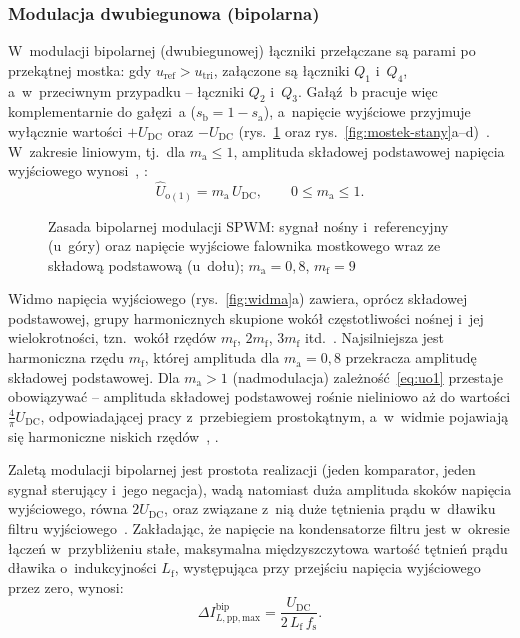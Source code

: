 \subsubsection*{Modulacja dwubiegunowa (bipolarna)}

W~modulacji bipolarnej (dwubiegunowej) łączniki przełączane są parami po
przekątnej mostka: gdy $u_\mathrm{ref} > u_\mathrm{tri}$, załączone są
łączniki $Q_1$ i~$Q_4$, a~w~przeciwnym przypadku -- łączniki $Q_2$ i~$Q_3$.
Gałąź~b pracuje więc komplementarnie do gałęzi~a ($s_\mathrm{b} = 1 -
s_\mathrm{a}$), a~napięcie wyjściowe przyjmuje wyłącznie wartości
$+U_\mathrm{DC}$ oraz $-U_\mathrm{DC}$ (rys.~\ref{fig:pwm-bipolarna}
oraz rys.~\ref{fig:mostek-stany}a--d)~\cite[s.~20]{instrukcja}.
W~zakresie liniowym, tj.~dla $m_\mathrm{a} \leq 1$, amplituda składowej
podstawowej napięcia wyjściowego wynosi~\cite[s.~11--12]{instrukcja},
\cite[podrozdz.~8-3-2-1]{mohan2003}:
\begin{equation}
  \hat{U}_{\mathrm{o}(1)} = m_\mathrm{a}\, U_\mathrm{DC},
  \qquad 0 \leq m_\mathrm{a} \leq 1.
  \label{eq:uo1}
\end{equation}

\begin{figure}[htbp]
  \centering
  
  \caption{Zasada bipolarnej modulacji SPWM: sygnał nośny i~referencyjny
    (u~góry) oraz napięcie wyjściowe falownika mostkowego wraz ze składową
    podstawową (u~dołu); $m_\mathrm{a} = 0{,}8$, $m_\mathrm{f} = 9$}
  \label{fig:pwm-bipolarna}
\end{figure}

Widmo napięcia wyjściowego (rys.~\ref{fig:widma}a) zawiera, oprócz
składowej podstawowej, grupy harmonicznych skupione wokół częstotliwości
nośnej i~jej wielokrotności, tzn.~wokół rzędów $m_\mathrm{f}$,
$2m_\mathrm{f}$, $3m_\mathrm{f}$ itd.~\cite[s.~193]{mohan2012}. Najsilniejsza jest harmoniczna rzędu
$m_\mathrm{f}$, której amplituda dla $m_\mathrm{a} = 0{,}8$ przekracza
amplitudę składowej podstawowej. Dla $m_\mathrm{a} > 1$ (nadmodulacja)
zależność~\eqref{eq:uo1} przestaje obowiązywać -- amplituda składowej
podstawowej rośnie nieliniowo aż do wartości $\frac{4}{\pi}U_\mathrm{DC}$,
odpowiadającej pracy z~przebiegiem prostokątnym, a~w~widmie pojawiają się
harmoniczne niskich rzędów~\cite[s.~11--12]{instrukcja}, \cite[podrozdz.~8-2-1]{mohan2003}.

Zaletą modulacji bipolarnej jest prostota realizacji (jeden komparator,
jeden sygnał sterujący i~jego negacja), wadą natomiast duża amplituda
skoków napięcia wyjściowego, równa $2U_\mathrm{DC}$, oraz związane z~nią
duże tętnienia prądu w~dławiku filtru wyjściowego~\cite[s.~10, 20]{instrukcja}. Zakładając, że napięcie
na kondensatorze filtru jest w~okresie łączeń w~przybliżeniu stałe,
maksymalna międzyszczytowa wartość tętnień prądu dławika o~indukcyjności
$L_\mathrm{f}$, występująca przy przejściu napięcia wyjściowego przez zero,
wynosi:
\begin{equation}
  \Delta I_{L,\mathrm{pp,max}}^{\mathrm{bip}} = \frac{U_\mathrm{DC}}{2\, L_\mathrm{f}\, f_\mathrm{s}}.
  \label{eq:tetnienia-bip}
\end{equation}

